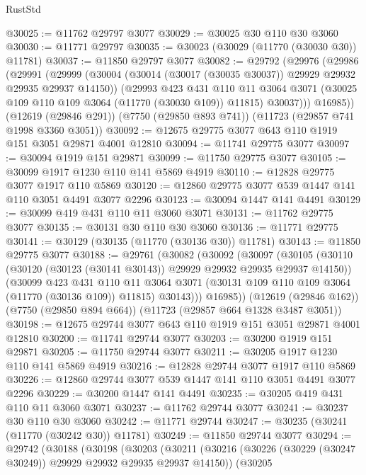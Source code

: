 \begin{lexlean}{RustStd}
\begin{coremodule}
@30025 := @11762 @29797 @3077
@30029 := @30025 @30 @110 @30 @3060
@30030 := @11771 @29797
@30035 := @30023 (@30029 (@11770 (@30030 @30)) @11781)
@30037 := @11850 @29797 @3077
@30082 := @29792
    (@29976
      (@29986
        (@29991
          (@29999
            (@30004 (@30014 (@30017 (@30035 @30037)) @29929 @29932 @29935 @29937 @14150))
            (@29993
              @423
              @431
              @110
              @11
              @3064
              @3071
              (@30025 @109 @110 @109 @3064 (@11770 (@30030 @109)) @11815)
              @30037)))
        @16985))
    (@12619 (@29846 @291))
    (@7750 (@29850 @893 @741))
    (@11723 (@29857 @741 @1998 @3360 @3051))
@30092 := @12675 @29775 @3077 @643 @110 @1919 @151 @3051 @29871 @4001 @12810
@30094 := @11741 @29775 @3077
@30097 := @30094 @1919 @151 @29871
@30099 := @11750 @29775 @3077
@30105 := @30099 @1917 @1230 @110 @141 @5869 @4919
@30110 := @12828 @29775 @3077 @1917 @110 @5869
@30120 := @12860 @29775 @3077 @539 @1447 @141 @110 @3051 @4491 @3077 @2296
@30123 := @30094 @1447 @141 @4491
@30129 := @30099 @419 @431 @110 @11 @3060 @3071
@30131 := @11762 @29775 @3077
@30135 := @30131 @30 @110 @30 @3060
@30136 := @11771 @29775
@30141 := @30129 (@30135 (@11770 (@30136 @30)) @11781)
@30143 := @11850 @29775 @3077
@30188 := @29761
    (@30082
      (@30092
        (@30097
          (@30105
            (@30110 (@30120 (@30123 (@30141 @30143)) @29929 @29932 @29935 @29937 @14150))
            (@30099
              @423
              @431
              @110
              @11
              @3064
              @3071
              (@30131 @109 @110 @109 @3064 (@11770 (@30136 @109)) @11815)
              @30143)))
        @16985))
    (@12619 (@29846 @162))
    (@7750 (@29850 @894 @664))
    (@11723 (@29857 @664 @1328 @3487 @3051))
@30198 := @12675 @29744 @3077 @643 @110 @1919 @151 @3051 @29871 @4001 @12810
@30200 := @11741 @29744 @3077
@30203 := @30200 @1919 @151 @29871
@30205 := @11750 @29744 @3077
@30211 := @30205 @1917 @1230 @110 @141 @5869 @4919
@30216 := @12828 @29744 @3077 @1917 @110 @5869
@30226 := @12860 @29744 @3077 @539 @1447 @141 @110 @3051 @4491 @3077 @2296
@30229 := @30200 @1447 @141 @4491
@30235 := @30205 @419 @431 @110 @11 @3060 @3071
@30237 := @11762 @29744 @3077
@30241 := @30237 @30 @110 @30 @3060
@30242 := @11771 @29744
@30247 := @30235 (@30241 (@11770 (@30242 @30)) @11781)
@30249 := @11850 @29744 @3077
@30294 := @29742
    (@30188
      (@30198
        (@30203
          (@30211
            (@30216 (@30226 (@30229 (@30247 @30249)) @29929 @29932 @29935 @29937 @14150))
            (@30205

\end{coremodule}
\end{lexlean}
